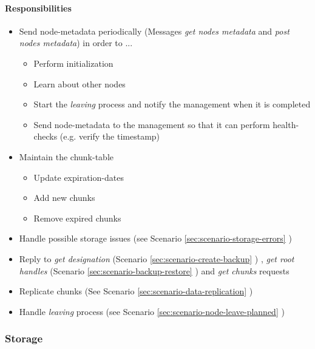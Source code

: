 \paragraph{Responsibilities}

\begin{itemize}
    \item Send \gls{node-metadata} periodically (Messages \emph{get nodes metadata} and \emph{post nodes metadata}) in order to ...
    \begin{itemize}
        \item Perform initialization
        \item Learn about other \glspl{node}
        \item Start the \emph{leaving} process and notify the \gls{management} when it is completed
        \item Send \gls{node-metadata} to the \gls{management} so that it can perform health-checks (e.g. verify the timestamp)
    \end{itemize}
    \item Maintain the \gls{chunk-table}
    \begin{itemize}
        \item Update \glspl{expiration-date}
        \item Add new \glspl{chunk}
        \item Remove expired \glspl{chunk}
    \end{itemize}
    \item Handle possible \gls{storage} issues (see Scenario \ref{sec:scenario-storage-errors} )
    \item Reply to \emph{get designation}  (Scenario \ref{sec:scenario-create-backup} ) , \emph{get root handles} (Scenario \ref{sec:scenario-backup-restore} ) and \emph{get chunks} requests
    \item Replicate \glspl{chunk} (See Scenario \ref{sec:scenario-data-replication} )
    \item Handle \emph{leaving} process (see Scenario \ref{sec:scenario-node-leave-planned} )
\end{itemize}

\subsubsection{Storage}\label{sec:component-storage}

